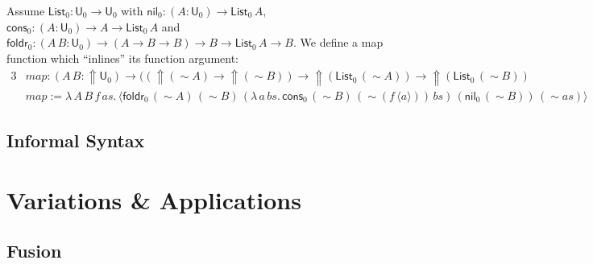 \documentclass[acmsmall]{acmart}
\newcommand{\mit}[1]{\mathit{#1}}
\newcommand{\msf}[1]{\mathsf{#1}}
\newcommand{\Lift}{{\Uparrow}}
\newcommand{\spl}{{\sim}}
\newcommand{\qut}[1]{\langle #1\rangle}
\renewcommand{\U}{\msf{U}}
\newcommand{\List}{\msf{List}}
\newcommand{\nil}{\msf{nil}}
\newcommand{\cons}{\msf{cons}}
\theoremstyle{remark}
\begin{document}
Assume $\List_0 : \U_0 \to \U_0$ with $\nil_0 : (A : \U_0) \to \List_0\,A$,
$\cons_0 : (A : \U_0) \to A \to \List_0\,A$ and $\msf{foldr}_0 : (A\,B : \U_0)
\to (A \to B \to B) \to B \to \List_0\,A \to B$. We define a map function which
``inlines'' its function argument:
\begin{alignat*}{3}
  & \mit{map} : (A\,B : \Lift\U_0) \to ((\Lift(\spl A) \to \Lift(\spl B))
      \to \Lift(\List_0\,(\spl A)) \to \Lift(\List_0\,(\spl B))\\
  & \mit{map} := \lambda\,A\,B\,f\,\mit{as}.\,
      \qut{\msf{foldr}_0\,
        (\spl A)\,(\spl B)\,
        (\lambda\,a\,\mit{bs}.\, \cons_0\,(\spl B)\,(\spl(f\,\qut{a}))\,\mit{bs})\,
        (\nil_0\,(\spl B))\,
        (\spl as)
        }
\end{alignat*}


















































\subsection{Informal Syntax}

\section{Variations \& Applications}

\subsection{Fusion}
\end{document}
